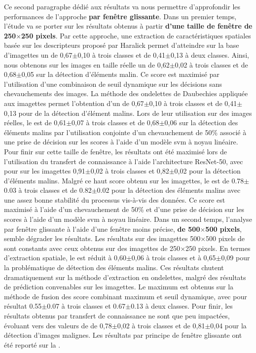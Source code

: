 Ce second paragraphe dédié aux résultats va nous permettre d'approfondir les performances de l'approche \textbf{par fenêtre glissante}. Dans un premier temps, l'étude va se porter sur les résultats obtenus à partir\textbf{ d'une taille de fenêtre de 250$\times$250 pixels}. Par cette approche, une extraction de caractéristiques spatiales basée sur les descripteurs proposé par Haralick permet d'atteindre sur la base d'imagettes un \fscore{} de 0,67$\pm$0,10 à trois classes et de 0,41$\pm$0,13 à deux classes. Ainsi, nous obtenons sur les images en taille réelle un \fscore{} de 0,62$\pm$0,02 à trois classes et de 0,68$\pm$0,05 sur la détection d'éléments malin. Ce score est maximisé par l'utilisation d'une combinaison de seuil dynamique sur les décisions sans chevauchements des images. La méthode des ondelettes de Daubechies appliquée aux imagettes permet l'obtention d'un \fscore{} de 0,67$\pm$0,10 à trois classes et de 0,41$\pm$0,13 pour de la détection d'élément malins. Lors de leur utilisation sur des images réelles, le \fscore{} est de 0,61$\pm$0,07 à trois classes et de 0,68$\pm$0,06 sur la détection des éléments malins par l'utilisation conjointe d'un chevauchement de 50\% associé à une prise de décision sur les scores à l'aide d'un modèle \gls{svm} à noyau linéaire. Pour finir sur cette taille de fenêtre, les résultats ont été maximisé lors de l'utilisation du transfert de connaissance à l'aide l'architecture ResNet-50, avec pour \fscore{} sur les imagettes 0,91$\pm$0,02 à trois classes et 0,82$\pm$0,02 pour la détection d'éléments malins. Malgré ce haut score obtenu sur les imagettes, le \fscore{} est de 0.78$\pm$0.03 à trois classes et de 0.82$\pm$0.02 pour la détection des éléments malins avec une assez bonne stabilité du processus vis-à-vis des données. Ce score est maximisé à l'aide d'un chevauchement de 50\% et d'une prise de décision sur les scores à l'aide d'un modèle \gls{svm} à noyau linéaire. Dans un second temps, l'analyse par fenêtre glissante à l'aide d'une fenêtre moins précise, \textbf{de 500$\times$500 pixels}, semble dégrader les résultats. Les résultats sur des imagettes 500$\times$500 pixels de sont constants avec ceux obtenus sur des imagettes de 250$\times$250 pixels. En termes d'extraction spatiale, le \fscore{} est réduit à 0,60$\pm$0,06 à trois classes et à 0,65$\pm$0,09 pour la problématique de détection des éléments malins. Ces résultats chutent dramatiquement sur la méthode d'extraction en ondelettes, malgré des résultats de prédiction convenables sur les imagettes. Le \fscore{} maximum est obtenus sur la méthode de fusion des score combinant maximum et seuil dynamique, avec pour résultat 0.55$\pm$0.07 à trois classes et 0.67$\pm$0.13 à deux classes. Pour finir, les résultats obtenus par transfert de connaissance ne sont que peu impactées, évoluant vers des valeurs de \fscore{} de 0,78$\pm$0,02 à trois classes et de 0,81$\pm$0,04 pour la détection d'images malignes. Les résultats par principe de fenêtre glissante ont été reporté sur la .\par

